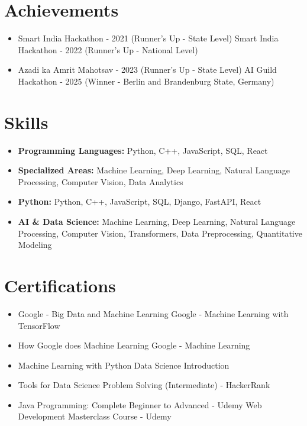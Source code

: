 \documentclass[a4paper,10pt]{article}
\begin{document}
\section*{Achievements}
\begin{itemize}
\item Smart India Hackathon - 2021 (Runner's Up - State Level) \hfill Smart India Hackathon - 2022 (Runner's Up - National Level)
\item Azadi ka Amrit Mahotsav - 2023 (Runner's Up - State Level) \hfill AI Guild Hackathon - 2025 (Winner - Berlin and Brandenburg State, Germany)
\end{itemize}

\section*{Skills}
\begin{itemize}
  \item \textbf{Programming Languages:} Python, C++, JavaScript, SQL, React
  \item \textbf{Specialized Areas:} Machine Learning, Deep Learning, Natural Language Processing, Computer Vision, Data Analytics
  \item \textbf{Python:} Python, C++, JavaScript, SQL, Django, FastAPI, React
  \item \textbf{AI \& Data Science:} Machine Learning, Deep Learning, Natural Language Processing, Computer Vision, Transformers, Data Preprocessing, Quantitative Modeling
\end{itemize}

\section*{Certifications}
\begin{itemize}
\item Google - Big Data and Machine Learning \hfill Google - Machine Learning with TensorFlow
\item How Google does Machine Learning \hfill Google - Machine Learning
\item Machine Learning with Python \hfill Data Science Introduction
\item Tools for Data Science \hfill Problem Solving (Intermediate) - HackerRank
\item Java Programming: Complete Beginner to Advanced - Udemy \hfill Web Development Masterclass Course - Udemy
\end{itemize}
\end{document}
